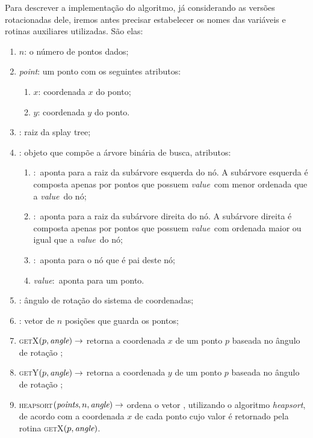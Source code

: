 Para descrever a implementação do algoritmo, já considerando as versões rotacionadas dele, iremos
antes precisar estabelecer os nomes das variáveis e rotinas auxiliares utilizadas.
São elas:
\begin{enumerate}
    \item $n$: o número de pontos dados;
    \item \textit{point}: um ponto com os seguintes atributos:
    \begin{enumerate}
        \item $x$: coordenada $x$ do ponto;
        \item $y$: coordenada $y$ do ponto.
    \end{enumerate}
    \item \raiz: raiz da splay tree;
    \item \no: objeto que compõe a árvore binária de busca,
    atributos:
    \begin{enumerate}
        \item \esq$:$ aponta para a raiz da subárvore esquerda do nó.
        A subárvore esquerda é composta apenas por pontos que possuem
        \textit{value}~com menor ordenada que a \textit{value}~do nó;
        \item \dir$:$ aponta para a raiz da subárvore direita do nó.
        A subárvore direita é composta apenas por pontos que possuem
        \textit{value}~com ordenada maior ou igual que a \textit{value}~do nó;
        \item \pai$:$ aponta para o nó que é pai deste nó;
        \item \textit{value}$:$ aponta para um ponto.
    \end{enumerate}
    \item \angulo: ângulo de rotação do sistema de coordenadas;
    \item \pontos: vetor de $n$ posições que guarda os pontos;
    \item \textsc{getX}$(p, \textit{angle}) \rightarrow$ retorna a coordenada $x$
    de um ponto $p$ baseada no ângulo de rotação \angulo;
    \item \textsc{getY}$(p, \textit{angle}) \rightarrow$ retorna a coordenada $y$
    de um ponto $p$ baseada no ângulo de rotação \angulo;
    \item \textsc{heapsort}$(\textit{points}, n, \textit{angle}) \rightarrow$ ordena o vetor \pontos,
    utilizando o algoritmo \textit{heapsort}, de acordo com a coordenada $x$ de cada ponto cujo
    valor é retornado pela rotina \textsc{getX}$(p, \textit{angle})$.
\end{enumerate}

